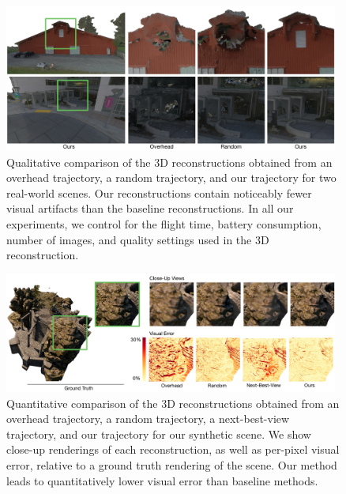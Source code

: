 \begin{figure}[t]
\begin{center}
\includegraphics[width=0.98\textwidth]{images/2017_iccv/real_world_results.jpg}{\vspace{-7pt}}
\end{center}
\caption{
Qualitative comparison of the 3D reconstructions obtained from an overhead trajectory, a random trajectory, and our trajectory for two real-world scenes.
Our reconstructions contain noticeably fewer visual artifacts than the baseline reconstructions.
In all our experiments, we control for the flight time, battery consumption, number of images, and quality settings used in the 3D reconstruction.
\vspace{-2pt}
}
\label{fig:results_side_by_side}
\end{figure}

\begin{figure}[t]
\begin{center}
\includegraphics[width=0.98\textwidth]{images/2017_iccv/visual_error.jpg}{\vspace{-7pt}}
\end{center}
\caption{
Quantitative comparison of the 3D reconstructions obtained from an overhead trajectory, a random trajectory, a next-best-view trajectory, and our trajectory for our synthetic scene.
We show close-up renderings of each reconstruction, as well as per-pixel visual error, relative to a ground truth rendering of the scene.
Our method leads to quantitatively lower visual error than baseline methods.
\vspace{-12pt}
}
\label{fig:results_quantitative}
\end{figure}

